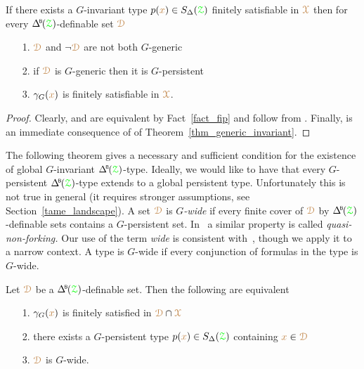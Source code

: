 \begin{corollary}\label{corol_def_mu}
  If there exists a $G$-invariant type $p({\color{brown} x})\in S_\Delta({\color{green}\EuScript Z})$ finitely satisfiable in ${\color{brown}\EuScript X}$ then for every $\BDelta({\grZ})$-definable set ${\color{brown}\EuScript D}$
  \begin{itemize}
    \item[1.] ${\color{brown}\EuScript D}$ and $\neg{\color{brown}\EuScript D}$ are not both $G$-generic
    \item[2.] if ${\color{brown}\EuScript D}$ is $G$-generic then it is $G$-persistent
    \item[3.] $\gamma_G({\color{brown} x})$ is finitely satisfiable in ${\color{brown}\EuScript X}$.
  \end{itemize}
\end{corollary}

\begin{proof}
  Clearly,  and  are equivalent by Fact~\ref{fact_fip} and follow from .
  Finally,  is an immediate consequence of  of Theorem~\ref{thm_generic_invariant}.
\end{proof}

The following theorem gives a necessary and sufficient condition for the  existence of global $G$-invariant $\BDelta({\grZ})$-type.
Ideally, we would like to have that every $G$-persistent $\BDelta({\grZ})$-type extends to a global persistent type.
Unfortunately this is not true in general (it requires stronger assumptions, see Section~\ref{tame_landscape}).
A set ${\color{brown}\EuScript D}$ is \emph{$G$-wide\/} if every finite cover of ${\color{brown}\EuScript D}$ by $\BDelta({\grZ})$-definable sets contains a $G$-persistent set.
In~\cite{CK} a similar property is called \textit{quasi-non-forking.}
Our use of the term \textit{wide\/} is consistent with~\cite{Hr}, though we apply it to a narrow context.
A type is $G$-wide if every conjunction of formulas in the type is $G$-wide.

\begin{theorem}\label{thm_generic_invariant2}
  Let ${\color{brown}\EuScript D}$ be a $\BDelta(\grZ)$-definable set.
  Then the following are equivalent 
  \begin{itemize}
    \item[1.] $\gamma_G({\color{brown} x})$ is finitely satisfied in ${\color{brown}\EuScript D}\cap{\color{brown}\EuScript X}$
    \item[2.] there exists a $G$-persistent type $p({\color{brown} x})\in S_\Delta({\color{green}\EuScript Z})$ containing ${\color{brown} x}\in{\color{brown}\EuScript D}$
    \item[3.] ${\color{brown}\EuScript D}$ is $G$-wide.
  \end{itemize}
\end{theorem}

